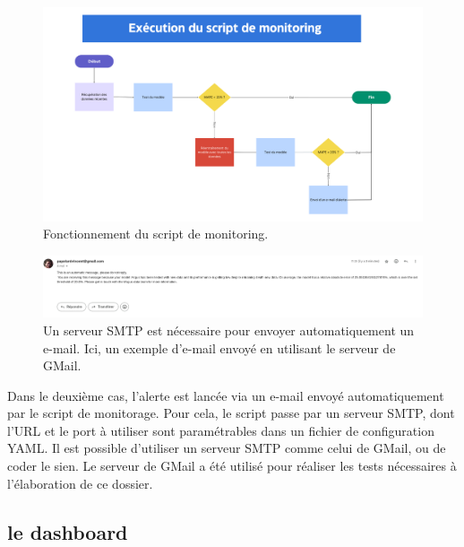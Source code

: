 \documentclass[french]{article}
\begin{document}
    \begin{figure}[h!]
        \includegraphics[width=15cm]{monitoring}
        \centering
        \caption{Fonctionnement du script de monitoring.}
    \end{figure}

    \begin{figure}[h!]
        \includegraphics[width=12cm]{mail}
        \centering
        \caption{Un serveur SMTP est nécessaire pour envoyer automatiquement un e-mail. Ici, un exemple d'e-mail envoyé en utilisant le serveur de GMail.}
    \end{figure}

    Dans le deuxième cas, l'alerte est lancée via un e-mail envoyé automatiquement par le script de monitorage. Pour cela, le script passe par un serveur SMTP, dont l'URL et le port à utiliser sont paramétrables dans un fichier de configuration YAML. Il est possible d'utiliser un serveur SMTP comme celui de GMail, ou de coder le sien. Le serveur de GMail a été utilisé pour réaliser les tests nécessaires à l'élaboration de ce dossier.


    \subsection{le dashboard}
\end{document}
